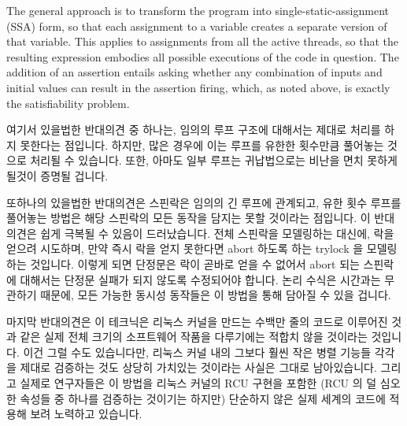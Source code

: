 The general approach is to transform the program into single-static-assignment
(SSA) form, so that each assignment to a variable creates a separate
version of that variable.
This applies to assignments from all the active threads, so that the
resulting expression embodies all possible executions of the code
in question.
The addition of an assertion entails asking whether any combination of
inputs and initial values can result in the assertion firing, which,
as noted above, is exactly the satisfiability problem.
\fi

여기서 있을법한 반대의견 중 하나는, 임의의 루프 구조에 대해서는 제대로 처리를
하지 못한다는 점입니다.
하지만, 많은 경우에 이는 루프를 유한한 횟수만큼 풀어놓는 것으로 처리될 수
있습니다.
또한, 아마도 일부 루프는 귀납법으로는 비난을 면치 못하게 될것이 증명될 겁니다.
\iffalse

One possible objection is that it does not gracefully handle arbitrary
looping constructs.
However, in many cases, this can be handled by unrolling the loop a
finite number of times.
In addition, perhaps some loops will also prove amenable to collapse
via inductive methods.
\fi

또하나의 있을법한 반대의견은 스핀락은 임의의 긴 루프에 관계되고, 유한 횟수
루프를 풀어놓는 방법은 해당 스핀락의 모든 동작을 담지는 못할 것이라는 점입니다.
이 반대의견은 쉽게 극복될 수 있음이 드러났습니다.
전체 스핀락을 모델링하는 대신에, 락을 얻으려 시도하며, 만약 즉시 락을 얻지
못한다면 abort 하도록 하는 trylock 을 모델링 하는 것입니다.
이렇게 되면 단정문은 락이 곧바로 얻을 수 없어서 abort 되는 스핀락에 대해서는
단정문 실패가 되지 않도록 수정되어야 합니다.
논리 수식은 시간과는 무관하기 때문에, 모든 가능한 동시성 동작들은 이 방법을
통해 담아질 수 있을 겁니다.
\iffalse

Another possible objection is that spinlocks involve arbitrarily long
loops, and any finite unrolling would fail to capture the full behavior
of the spinlock.
It turns out that this objection is easily overcome.
Instead of modeling a full spinlock, model a trylock that attempts to
obtain the lock, and aborts if it fails to immediately do so.
The assertion must then be crafted so as to avoid firing in cases
where a spinlock aborted due to the lock not being immediately available.
Because the logic expression is independent of time, all possible
concurrency behaviors will be captured via this approach.
\fi

마지막 반대의견은 이 테크닉은 리눅스 커널을 만드는 수백만 줄의 코드로 이루어진
것과 같은 실제 전체 크기의 소프트웨어 작품을 다루기에는 적합치 않을 것이라는
것입니다.
이건 그럴 수도 있습니다만, 리눅스 커널 내의 그보다 훨씬 작은 병렬 기능들 각각을
제대로 검증하는 것도 상당히 가치있는 것이라는 사실은 그대로 남아있습니다.
그리고 실제로 연구자들은 이 방법을 리눅스 커널의 RCU 구현을 포함한 (RCU 의 덜
심오한 속성들 중 하나를 검증하는 것이기는 하지만) 단순하지 않은 실제 세계의
코드에 적용해 보려 노력하고 있습니다.

